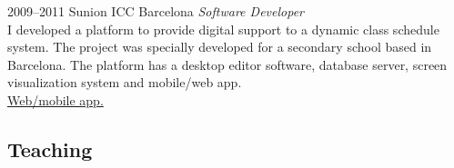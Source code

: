 \documentclass[]{friggeri-cv} %
\begin{document}
\begin{entrylist}

\entry
{2009--2011}
{Sunion ICC}
{Barcelona}
{%
\emph{Software Developer} \\
I developed a platform to provide digital support to a dynamic class
schedule system. The project was specially developed for a
secondary school based in Barcelona. The platform has a desktop editor
software, database server, screen visualization system and mobile/web
app. \\
\href{http://horari.sunion.net}{{\FA\faExternalLink} Web/mobile app.}
}


\end{entrylist}

\subsection{Teaching}
\end{document}
